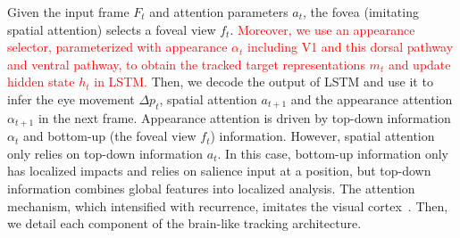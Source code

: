 \documentclass[journal]{IEEEtran}
\begin{document}
Given the input frame $F_t$ and attention parameters $a_t$, the fovea (imitating spatial attention) selects a foveal view $f_t$. 
\textcolor{red}{Moreover, we use an appearance selector, parameterized with appearance $\alpha _t$ including V1 and this dorsal pathway and ventral pathway, to obtain the tracked target representations $m_t$ 
	and update hidden state $h_t$ in LSTM.}
Then, we decode the output of LSTM and use it to infer the eye movement $\Delta p_t$, spatial attention $a_{t+1}$ and the appearance attention $\alpha _{t+1}$ in the next frame.  
Appearance attention is driven by top-down information $\alpha _t$ and bottom-up (the foveal view $f_t$) information. 
However, spatial attention only relies on top-down information $a_t$.
In this case, bottom-up information only has localized impacts and relies on salience input at a position, 
but top-down information combines global features into localized analysis. 
The attention mechanism, which intensified with recurrence, imitates the visual cortex~\cite{attention}.
Then, we detail each component of the brain-like tracking architecture. 


\end{document}
